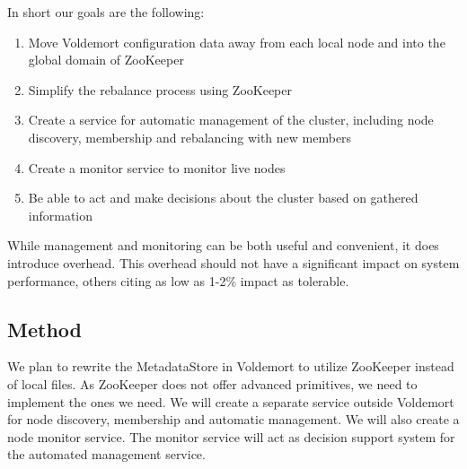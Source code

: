 
In short our goals are the following:

\begin{enumerate}
	\item{Move Voldemort configuration data away from each local node and into the global domain of ZooKeeper}
	\item{Simplify the rebalance process using ZooKeeper}
	\item{Create a service for automatic management of the cluster, including node discovery, membership and rebalancing with new members}
	\item{Create a monitor service to monitor live nodes}
	\item{Be able to act and make decisions about the cluster based on gathered information}
\end{enumerate}

While management and monitoring can be both useful and convenient, it does introduce overhead. This overhead should not have a significant impact on system performance, others citing as low as 1-2\% impact as tolerable\cite{Rabl:2012:SBD:2367502.2367512}.

\subsection{Method}
We plan to rewrite the MetadataStore in Voldemort to utilize ZooKeeper instead of local files. As ZooKeeper does not offer advanced primitives, we need to implement the ones we need. We will create a separate service outside Voldemort for node discovery, membership and automatic management. We will also create a node monitor service. The monitor service will act as decision support system for the automated management service. 





